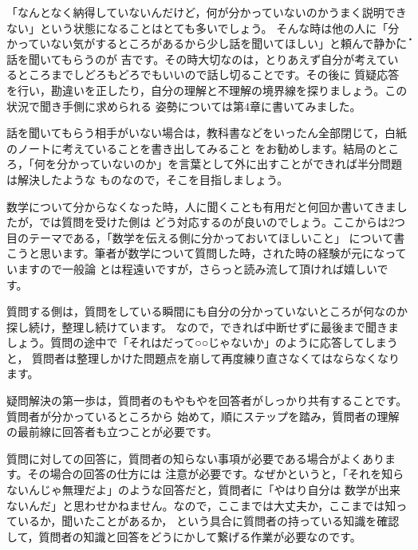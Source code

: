 \documentclass[./main]{subfiles}
\begin{document}

「なんとなく納得していないんだけど，何が分かっていないのかうまく説明できない」という状態になることはとても多いでしょう。
そんな時は他の人に「分かっていない気がするところがあるから少し話を聞いてほしい」と頼んで\.静\.か\.に話を聞いてもらうのが
吉です。その時大切なのは，とりあえず自分が考えているところまでしどろもどろでもいいので話し切ることです。その後に
質疑応答を行い，勘違いを正したり，自分の理解と不理解の境界線を探りましょう。この状況で聞き手側に求められる
姿勢については第4章に書いてみました。

話を聞いてもらう相手がいない場合は，教科書などをいったん全部閉じて，白紙のノートに考えていることを書き出してみること
をお勧めします。結局のところ，「何を分かっていないのか」を言葉として外に出すことができれば半分問題は解決したような
ものなので，そこを目指しましょう。


数学について分からなくなった時，人に聞くことも有用だと何回か書いてきましたが，では質問を受けた側は
どう対応するのが良いのでしょう。ここからは2つ目のテーマである，「数学を伝える側に分かっておいてほしいこと」
について書こうと思います。筆者が数学について質問した時，された時の経験が元になっていますので一般論
とは程遠いですが，さらっと読み流して頂ければ嬉しいです。


質問する側は，質問をしている瞬間にも自分の分かっていないところが何なのか探し続け，整理し続けています。
なので，できれば中断せずに最後まで聞きましょう。質問の途中で「それはだって○○じゃないか」のように応答してしまうと，
質問者は整理しかけた問題点を崩して再度練り直さなくてはならなくなります。


疑問解決の第一歩は，質問者のもやもやを回答者がしっかり共有することです。質問者が分かっているところから
始めて，順にステップを踏み，質問者の理解の最前線に回答者も立つことが必要です。


質問に対しての回答に，質問者の知らない事項が必要である場合がよくあります。その場合の回答の仕方には
注意が必要です。なぜかというと，「それを知らないんじゃ無理だよ」のような回答だと，質問者に「やはり自分は
数学が出来ないんだ」と思わせかねません。なので，ここまでは大丈夫か，ここまでは知っているか，聞いたことがあるか，
という具合に質問者の持っている知識を確認して，質問者の知識と回答をどうにかして繋げる作業が必要なのです。
\end{document}
